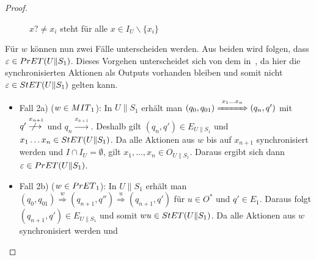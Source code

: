 \begin{proof}
\begin{itemize}
\begin{figure} [h!tbp]
\begin{center}
        \caption{$x?\neq x_i$ steht für alle $x\in I_U\backslash\{x_i\}$}
\label{UohneE}
      \end{center}
      \end{figure}
      Für $w$ können nun zwei Fälle unterscheiden werden. Aus beiden wird
      folgen, dass $\varepsilon\in PrET{}(U\|S_1)$. Dieses Vorgehen unterscheidet sich von dem
      in~\cite{Vogler2014EIO}, da hier die synchronisierten Aktionen als Outputs
      vorhanden bleiben und somit nicht $\varepsilon\in StET{}(U\|S_1)$ gelten
      kann.
      \begin{itemize}
        \item Fall 2a) ($w\in MIT{}_1$): In $U\|S_1$ erhält man
          $(q_0,q_{01}) \overset{x_1\dots x_n}{\xRightarrow{\hspace{1cm}}} (q_n,q')$ mit
          $q' \overset{x_{n+1}}{\not{\hspace{-0.2cm}\longrightarrow}}$ und $q_n
          \overset{x_{n+1}}{\longrightarrow}$. Deshalb gilt $(q_n,q')\in
          E_{U\|S_1}$ und $x_1\dots x_n\in StET{}(U\|S_1)$. Da alle Aktionen aus
          $w$ bis auf $x_{n+1}$ synchronisiert werden und $I\cap I_U =
          \emptyset$, gilt $x_1,\dots ,x_n\in
          O_{U\|S_1}$. Daraus ergibt sich dann $\varepsilon\in PrET{}(U\|S_1)$.
        \item Fall 2b) ($w\in PrET{}_1$): In $U\|S_1$ erhält man
          $(q_0,q_{01}) \overset{w}{\Rightarrow} (q_{n+1},q'')
          \overset{u}{\Rightarrow} (q_{n+1},q')$ für $u\in O^*$ und $q'\in
          E_1$. Daraus folgt $(q_{n+1},q')\in E_{U\|S_1}$ und somit $wu\in
          StET{}(U\|S_1)$. Da alle Aktionen aus $w$ synchronisiert werden und

\end{itemize}
\end{itemize}
\end{proof}
